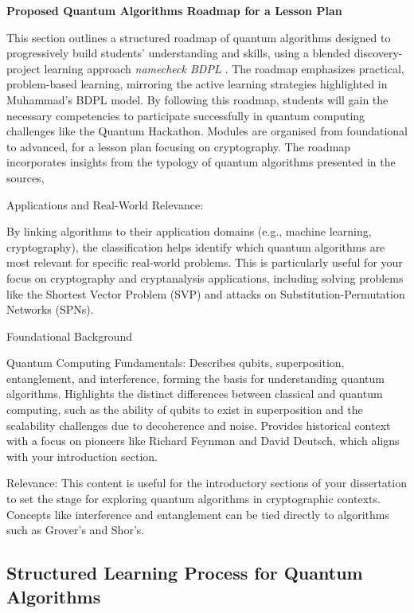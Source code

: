 \textbf{Proposed Quantum Algorithms Roadmap for a Lesson Plan}

This section outlines a structured roadmap of quantum algorithms designed to progressively build students' understanding 
and skills, using a blended discovery-project learning approach \emph{namecheck BDPL \cite{muhammad:2020}}. 
The roadmap emphasizes practical, problem-based learning, mirroring the active learning strategies highlighted in Muhammad’s BDPL model. 
By following this roadmap, students will gain the necessary competencies to participate successfully in quantum computing challenges like the Quantum Hackathon.
Modules are organised from foundational to advanced, for a lesson plan focusing on cryptography. 
The roadmap incorporates insights from the typology of quantum algorithms presented in the sources, 

Applications and Real-World Relevance:

By linking algorithms to their application domains (e.g., machine learning, cryptography), the classification helps identify which quantum algorithms are most relevant for specific real-world problems.
This is particularly useful for your focus on cryptography and cryptanalysis applications, including solving problems like the Shortest Vector Problem (SVP) and attacks on Substitution-Permutation Networks (SPNs).

Foundational Background

Quantum Computing Fundamentals:
Describes qubits, superposition, entanglement, and interference, forming the basis for understanding quantum algorithms.
Highlights the distinct differences between classical and quantum computing, such as the ability of qubits to exist in superposition and the scalability challenges due to decoherence and noise.
Provides historical context with a focus on pioneers like Richard Feynman and David Deutsch, which aligns with your introduction section.

Relevance:
This content is useful for the introductory sections of your dissertation to set the stage for exploring quantum algorithms in cryptographic contexts.
Concepts like interference and entanglement can be tied directly to algorithms such as Grover's and Shor's.



\subsection{Structured Learning Process for Quantum Algorithms}

